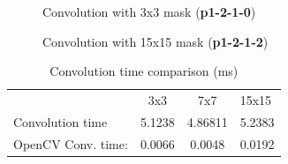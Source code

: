 \documentclass[12pt,a4paper]{article}
\begin{document}
\begin{figure}[!h]
	\centering
	{%
		\setlength{\fboxsep}{1pt}%
		\setlength{\fboxrule}{1pt}%
	}%
	\caption{Convolution with 3x3 mask (\textbf{p1-2-1-0})}
	\label{fig:p1-2-1-0}
\end{figure}

\begin{figure}[!h]
	\centering
	{%
		\setlength{\fboxsep}{1pt}%
		\setlength{\fboxrule}{1pt}%
	}%
	\caption{Convolution with 15x15 mask (\textbf{p1-2-1-2})}
	\label{fig:p1-2-1-2}
\end{figure}

\begin{table}[]
 \centering
 \caption{Convolution time comparison (ms)}
  \label{table:convolution-opencv}
 \begin{tabular}{lccl}
    \multicolumn{1}{c}{} & 3x3    & 7x7     & 15x15  \\
 Convolution time     &
    5.1238 & 4.86811 & 5.2383 \\
 OpenCV Conv. time:   & 0.0066 & 0.0048  &
    0.0192
 \end{tabular}
 \end{table}
 
\end{document}
